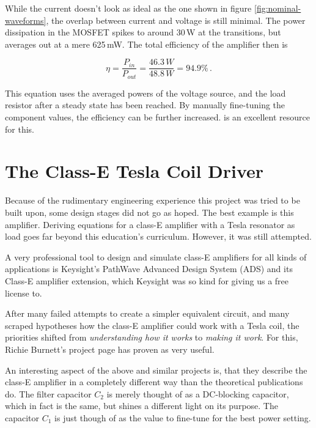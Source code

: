 While the current doesn't look as ideal as the one shown in figure \ref{fig:nominal-waveforms}, the overlap between current and voltage is still minimal. The power dissipation in the MOSFET spikes to around 30\,W at the transitions, but averages out at a mere 625\,mW. The total efficiency of the amplifier then is

\begin{equation}
    \eta = \frac{P_{in}}{P_{out}} = \frac{46.3\,W}{48.8\,W} = 94.9\%\,.
\end{equation}

This equation uses the averaged powers of the voltage source, and the load resistor after a steady state has been reached. By manually fine-tuning the component values, the efficiency can be further increased. 
is an excellent resource for this.

\section{The Class-E Tesla Coil Driver}

Because of the rudimentary engineering experience this project was tried to be built upon, some design stages did not go as hoped. The best example is this amplifier. Deriving equations for a class-E amplifier with a Tesla resonator as load goes far beyond this education's curriculum. However, it was still attempted.

A very professional tool to design and simulate class-E amplifiers for all kinds of applications is Keysight's PathWave Advanced Design System (ADS) and its Class-E amplifier extension, which Keysight was so kind for giving us a free license to. %

After many failed attempts to create a simpler equivalent circuit, and many scraped hypotheses how the class-E amplifier could work with a Tesla coil, the priorities shifted from \emph{understanding how it works} to \emph{making it work}. For this, Richie Burnett's project page has proven as very useful.

An interesting aspect of the above and similar projects is, that they describe the class-E amplifier in a completely different way than the theoretical publications do. The filter capacitor \(C_2\) is merely thought of as a DC-blocking capacitor, which in fact is the same, but shines a different light on its purpose. The capacitor \(C_1\) is just though of as the value to fine-tune for the best power setting.

